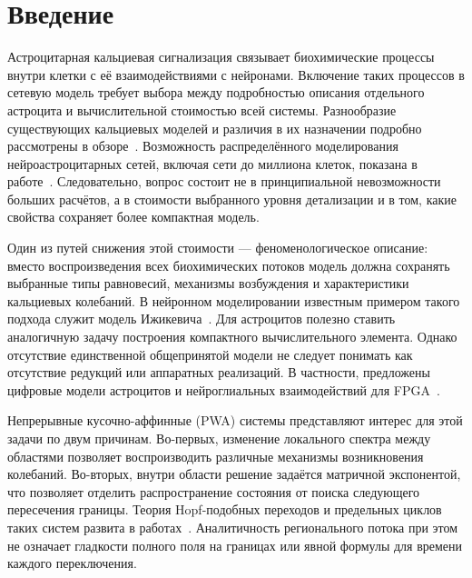 \section{Введение}
Астроцитарная кальциевая сигнализация связывает биохимические процессы внутри клетки с её взаимодействиями с нейронами. Включение таких процессов в сетевую модель требует выбора между подробностью описания отдельного астроцита и вычислительной стоимостью всей системы. Разнообразие существующих кальциевых моделей и различия в их назначении подробно рассмотрены в обзоре~\cite{Manninen2018}. Возможность распределённого моделирования нейроастроцитарных сетей, включая сети до миллиона клеток, показана в работе~\cite{Jiang2025}. Следовательно, вопрос состоит не в принципиальной невозможности больших расчётов, а в стоимости выбранного уровня детализации и в том, какие свойства сохраняет более компактная модель.

Один из путей снижения этой стоимости --- феноменологическое описание: вместо воспроизведения всех биохимических потоков модель должна сохранять выбранные типы равновесий, механизмы возбуждения и характеристики кальциевых колебаний. В нейронном моделировании известным примером такого подхода служит модель Ижикевича~\cite{Izhikevich2003}. Для астроцитов полезно ставить аналогичную задачу построения компактного вычислительного элемента. Однако отсутствие единственной общепринятой модели не следует понимать как отсутствие редукций или аппаратных реализаций. В частности, предложены цифровые модели астроцитов и нейроглиальных взаимодействий для FPGA~\cite{DigitalAstrocyte2015}.

Непрерывные кусочно-аффинные (PWA) системы представляют интерес для этой задачи по двум причинам. Во-первых, изменение локального спектра между областями позволяет воспроизводить различные механизмы возникновения колебаний. Во-вторых, внутри области решение задаётся матричной экспонентой, что позволяет отделить распространение состояния от поиска следующего пересечения границы. Теория Hopf-подобных переходов и предельных циклов таких систем развита в работах~\cite{Simpson2022,SimpsonMeiss2007,LlibrePonceValls2015,ChenLiXieYue2017,ChenFengJiaMeng2026}. Аналитичность регионального потока при этом не означает гладкости полного поля на границах или явной формулы для времени каждого переключения.

